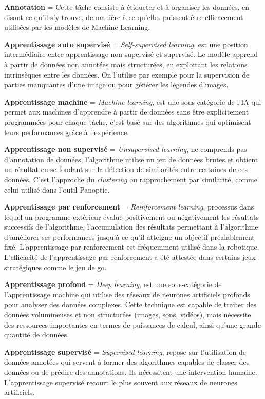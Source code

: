\textbf{Annotation} = Cette tâche consiste à étiqueter et à organiser les données, en disant ce qu'il s'y trouve, de manière à ce qu’elles puissent être efficacement utilisées par les modèles de Machine Learning.

\textbf{Apprentissage auto supervisé} = \textit{Self-supervised learning}, est une position intermédiaire entre apprentissage non supervisé et supervisé. Le modèle apprend à partir de données non annotées mais structurées, en exploitant les relations intrinsèques entre les données. On l'utilise par exemple pour la supervision de parties manquantes d'une image ou pour générer les légendes d'images.

\textbf{Apprentissage machine} = \textit{Machine learning}, est une sous-catégorie de l'IA qui permet aux machines d'apprendre à partir de données sans être explicitement programmées pour chaque tâche, c'est basé sur des algorithmes qui optimisent leurs performances grâce à l'expérience.

\textbf{Apprentissage non supervisé} = \textit{Unsupervised learning}, ne comprends pas d'annotation de données, l’algorithme utilise un jeu de données brutes et obtient un résultat en se fondant sur la détection de similarités entre certaines de ces données. C'est l'approche du \textit{clustering} ou rapprochement par similarité, comme celui utilisé dans l'outil Panoptic.

\textbf{Apprentissage par renforcement} = \textit{Reinforcement learning}, processus dans lequel un programme extérieur évalue positivement ou négativement les résultats successifs de l’algorithme, l’accumulation des résultats permettant à l’algorithme d’améliorer ses performances jusqu’à ce qu’il atteigne un objectif préalablement fixé. L’apprentissage par renforcement est fréquemment utilisé dans la robotique. L’efficacité de l’apprentissage par renforcement a été attestée dans certains jeux stratégiques comme le jeu de go.

\textbf{Apprentissage profond} = \textit{Deep learning}, est une sous-catégorie de l'apprentissage machine qui utilise des réseaux de neurones artificiels profonds pour analyser des données complexes. Cette technique est capable de traiter des données volumineuses et non structurées (images, sons, vidéos), mais nécessite des ressources importantes en termes de puissances de calcul, ainsi qu'une grande quantité de données.

\textbf{Apprentissage supervisé} = \textit{Supervised learning}, repose sur l'utilisation de données annotées qui servent à former des algorithmes capables de classer des données ou de prédire des annotations. Ils nécessitent une intervention humaine. L’apprentissage supervisé recourt le plus souvent aux réseaux de neurones artificiels.


